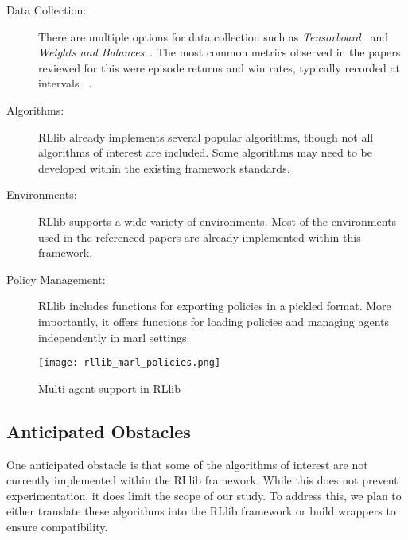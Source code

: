 \begin{description}
    \item[Data Collection:] 
    There are multiple options for data collection such as \emph{Tensorboard}~\cite{zotero-2601} 
    and \emph{Weights and Balances}~\cite{zotero-2603}. 
    The most common metrics observed in the papers reviewed for this \printdoctype 
    were episode returns and win rates, typically recorded at intervals~
    \cite{zhong2024,yu2022,papoudakis2021,lowe2020,zheng2020}.
    \item[Algorithms:] 
    RLlib already implements several popular algorithms, though not all algorithms of interest are 
    included. Some algorithms may need to be developed within the existing framework standards.
    \item[Environments:] 
    RLlib supports a wide variety of environments. Most of the environments used in 
    the referenced papers are already implemented within this framework.
    \item[Policy Management:] 
    RLlib includes functions for exporting policies in a pickled format. 
    More importantly, it offers functions for loading policies and managing agents 
    independently in \gls{marl} settings.
\end{description}
\begin{figure}[htbp]
    \texttt{[image: rllib\_marl\_policies.png]}
    \caption{Multi-agent support in RLlib~\cite{zotero-2599}}
    \label{fig:rllib_marl_policies}
\end{figure}

\subsection{Anticipated Obstacles}
One anticipated obstacle is that some of the algorithms of interest are not currently 
implemented within the RLlib framework. While this does not prevent experimentation, 
it does limit the scope of our study. To address this, we plan to either translate 
these algorithms into the RLlib framework or build wrappers to ensure compatibility.

